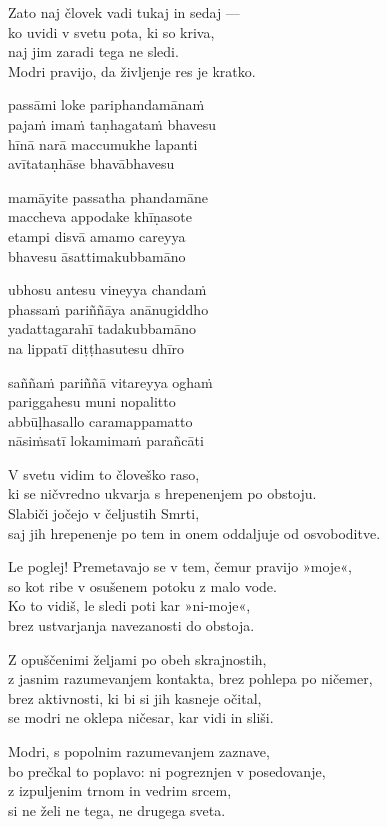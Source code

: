 Zato naj človek vadi tukaj in sedaj —\\
ko uvidi v svetu pota, ki so kriva,\\
naj jim zaradi tega ne sledi.\\
Modri pravijo, da življenje res je kratko.


\clearpage

passāmi loke pariphandamānaṁ\\
pajaṁ imaṁ taṇhagataṁ bhavesu\\
hīnā narā maccumukhe lapanti\\
avītataṇhāse bhavābhavesu

mamāyite passatha phandamāne\\
maccheva appodake khīṇasote\\
etampi disvā amamo careyya\\
bhavesu āsattimakubbamāno

ubhosu antesu vineyya chandaṁ\\
phassaṁ pariññāya anānugiddho\\
yadattagarahī tadakubbamāno\\
na lippatī diṭṭhasutesu dhīro

saññaṁ pariññā vitareyya oghaṁ\\
pariggahesu muni nopalitto\\
abbūḷhasallo caramappamatto\\
nāsiṁsatī lokamimaṁ parañcāti


\clearpage

V svetu vidim to človeško raso,\\
ki se ničvredno ukvarja s hrepenenjem po obstoju.\\
Slabiči jočejo v čeljustih Smrti,\\
saj jih hrepenenje po tem in onem oddaljuje od osvoboditve.

Le poglej! Premetavajo se v tem, čemur pravijo »moje«,\\
so kot ribe v osušenem potoku z malo vode.\\
Ko to vidiš, le sledi poti kar »ni-moje«,\\
brez ustvarjanja navezanosti do obstoja.

Z opuščenimi željami po obeh skrajnostih,\\
z jasnim razumevanjem kontakta, brez pohlepa po ničemer,\\
brez aktivnosti, ki bi si jih kasneje očital,\\
se modri ne oklepa ničesar, kar vidi in sliši.

Modri, s popolnim razumevanjem zaznave,\\
bo prečkal to poplavo: ni pogreznjen v posedovanje,\\
z izpuljenim trnom in vedrim srcem,\\
si ne želi ne tega, ne drugega sveta.

